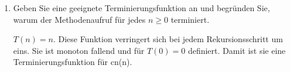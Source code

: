 \documentclass{lehramt-informatik-aufgabe}
\begin{document}
\begin{enumerate}
\begin{liAntwort}
\end{liAntwort}


\item Geben Sie eine geeignete Terminierungsfunktion an und begründen
Sie, warum der Methodenaufruf  für jedes $n \geq 0$
terminiert.

\begin{liAntwort}
$T(n) = n$. Diese Funktion verringert sich bei jedem Rekursionsschritt
um eins. Sie ist monoton fallend und für $T(0) = 0$ definiert. Damit
ist sie eine Terminierungsfunktion für cn(n).
\end{liAntwort}

\end{enumerate}
\end{document}
